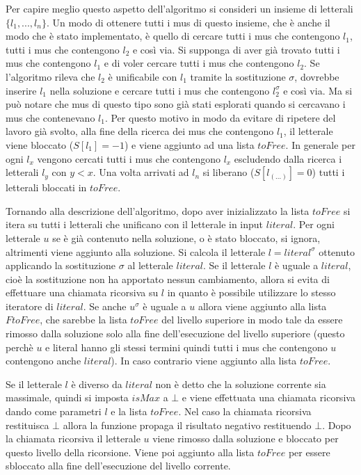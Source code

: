 \documentclass[./main.tex]{subfiles}
\begin{document}
Per capire meglio questo aspetto dell'algoritmo si consideri un insieme di 
letterali $\{l_1, ... , l_n\}$. Un modo di ottenere tutti i mus di questo insieme,
che è anche il modo che è stato implementato,
è quello di cercare tutti i mus che contengono $l_1$, tutti i mus che contengono $l_2$ e così via.
Si supponga di aver già trovato tutti i mus che contengono $l_1$ e di 
voler cercare tutti i mus che contengono $l_2$. 
Se l'algoritmo rileva che $l_2$ è unificabile con $l_1$ tramite la sostituzione $\sigma$,
dovrebbe inserire $l_1$ nella soluzione e cercare tutti i mus
che contengono $l_2^\sigma$ e così via.
Ma si può notare che mus di questo tipo sono già stati esplorati quando 
si cercavano i mus che contenevano $l_1$.
Per questo motivo in modo da evitare di ripetere del lavoro già svolto,
alla fine della ricerca dei mus che contengono $l_1$, il letterale viene
bloccato ($S[l_1] = -1$) e viene aggiunto ad una lista $toFree$.
In generale per ogni $l_x$ vengono cercati tutti i mus che contengono $l_x$
escludendo dalla ricerca i letterali $l_y$ con $y < x$.
Una volta arrivati ad $l_n$ si liberano ($S[l_{(...)}] = 0$) tutti i letterali bloccati in $toFree$.

Tornando alla descrizione dell'algoritmo, dopo aver inizializzato la lista $toFree$
si itera su tutti i letterali che unificano con il letterale in input $literal$.
Per ogni letterale $u$ se è già contenuto nella soluzione, o è stato bloccato, si ignora,
altrimenti viene aggiunto alla soluzione.
Si calcola il letterale $l = literal^\sigma$ ottenuto applicando la sostituzione
$\sigma$ al letterale $literal$. 
Se il letterale $l$ è uguale a $literal$, cioè la sostituzione non ha 
apportato nessun cambiamento, 
allora si evita di effettuare una chiamata ricorsiva su $l$ in quanto è possibile
utilizzare lo stesso iteratore di $literal$. 
Se anche $u^\sigma$ è uguale a $u$ allora viene aggiunto alla lista $FtoFree$,
che sarebbe la lista $toFree$ del livello superiore in modo tale da 
essere rimosso dalla soluzione solo alla fine dell'esecuzione del livello superiore
(questo perchè $u$ e literal hanno gli stessi termini quindi tutti i mus che contengono $u$ contengono anche $literal$).
In caso contrario viene aggiunto alla lista $toFree$.

Se il letterale $l$ è diverso da $literal$ non è detto che la soluzione corrente sia massimale,
quindi si imposta $isMax$ a $\bot$ e viene effettuata una chiamata ricorsiva dando come parametri $l$
e la lista $toFree$. 
Nel caso la chiamata ricorsiva restituisca $\bot$ allora la funzione propaga il risultato negativo restituendo $\bot$.
Dopo la chiamata ricorsiva il letterale $u$ viene rimosso dalla soluzione e bloccato per 
questo livello della ricorsione. Viene poi aggiunto alla lista $toFree$ per essere sbloccato 
alla fine dell'esecuzione del livello corrente.
\end{document}
